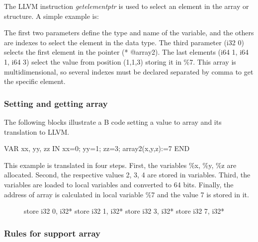 The LLVM instruction \textit{getelementptr} is used to select an element in
the array or structure. A simple example is: 

\begin{llvmcode}
\end{llvmcode}


The first two parameters define the type and name of the variable, and the
others are indexes to select the element in the data type. The third parameter (i32 0)
selects the first element in the pointer (* @array2). The last elements 
(i64 1, i64 1, i64 3) select the value from position (1,1,3) storing it in \%7.
This array is multidimensional, so several indexes must be declared separated
by comma to get the specific element.

\subsubsection{Setting and getting array}

The following blocks illustrate a B code setting a value to array
and its translation to LLVM. 

\begin{pascalcode} 
VAR xx, yy, zz IN
	xx=0;
	yy=1;
	zz=3;
	array2(x,y,z):=7
END
\end{pascalcode}

This example is translated in four steps. First, the variables \%x, \%y, \%z 
are allocated. Second, the respective values 2, 3, 4 are stored in variables. 
Third, the variables are loaded to local variables and converted to 64 bits. 
Finally, the address of array is calculated in local variable \%7 and the value 
7 is stored in it.  
\begin{figure}[h]
\begin{llvmcode}
store i32 0, i32* %
store i32 1, i32* %
store i32 3, i32* %
store i32 7, i32* %
\end{llvmcode}
\end{figure}


\subsubsection{Rules for support array}


